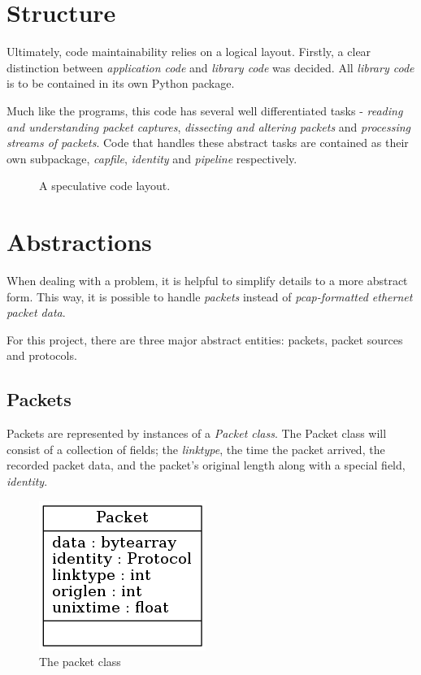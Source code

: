 \documentclass[10pt,a4paper,notitlepage,twoside]{report}
\begin{document}
\section{Structure}
Ultimately, code maintainability relies on a logical layout. Firstly, a clear distinction between \emph{application code} and \emph{library code} was decided. All \emph{library code} is to be contained in its own Python package.

Much like the programs, this code has several well differentiated tasks - \emph{reading and understanding packet captures}, \emph{dissecting and altering packets} and \emph{processing streams of packets}. Code that handles these abstract tasks are contained as their own subpackage, \emph{capfile}, \emph{identity} and \emph{pipeline} respectively.

\begin{figure}[H]
\caption{A speculative code layout.}
\label{fig:codelayout}
\end{figure}
\section{Abstractions}
When dealing with a problem, it is helpful to simplify details to a more abstract form. This way, it is possible to handle \emph{packets} instead of \emph{pcap-formatted ethernet packet data}.

For this project, there are three major abstract entities: packets, packet sources and protocols.

\subsection{Packets}
Packets are represented by instances of a \emph{Packet class}. The Packet class will consist of a collection of fields; the \emph{linktype}, the time the packet arrived, the recorded packet data, and the packet's original length along with a special field, \emph{identity}.

\begin{figure}
\center
\includegraphics[scale=0.7]{diagrams/packet.png}
\caption{The packet class}
\end{figure}
\end{document}
